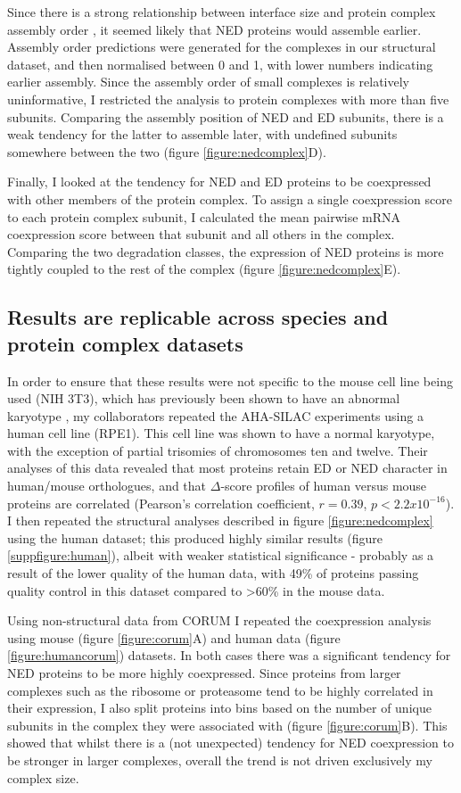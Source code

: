 \documentclass[a4paper,11pt,twoside,openright]{scrbook}
\begin{document}
Since there is a strong relationship between interface size and protein complex
assembly order \cite{Marsh2013}, it seemed likely that NED proteins would
assemble earlier. Assembly order predictions were generated for the complexes in
our structural dataset, and then normalised between 0 and 1, with lower numbers
indicating earlier assembly. Since the assembly order of small complexes is
relatively uninformative, I restricted the analysis to protein complexes with
more than five subunits. Comparing the assembly position of NED and ED subunits,
there is a weak tendency for the latter to assemble later, with undefined
subunits somewhere between the two (figure \ref{figure:nedcomplex}D).

Finally, I looked at the tendency for NED and ED proteins to be coexpressed with
other members of the protein complex. To assign a single coexpression score to
each protein complex subunit, I calculated the mean pairwise mRNA coexpression
score between that subunit and all others in the complex. Comparing the two
degradation classes, the expression of NED proteins is more tightly coupled to
the rest of the complex (figure \ref{figure:nedcomplex}E).

\subsection{Results are replicable across species and protein complex datasets}
In order to ensure that these results were not specific to the mouse cell line
being used (NIH 3T3), which has previously been shown to have an abnormal
karyotype \cite{Leibiger2013}, my collaborators repeated the AHA-SILAC
experiments using a human cell line (RPE1). This cell line was shown to have a
normal karyotype, with the exception of partial trisomies of chromosomes ten and
twelve. Their analyses of this data revealed that most proteins retain ED or NED
character in human/mouse orthologues, and that $\Delta$-score profiles of human
versus mouse proteins are correlated (Pearson’s correlation coefficient, $r =
0.39$, $p < 2.2x10^{-16}$). I then repeated the structural analyses described in
figure \ref{figure:nedcomplex} using the human dataset; this produced highly
similar results (figure \ref{suppfigure:human}), albeit with weaker statistical
significance - probably as a result of the lower quality of the human data, with
49\% of proteins passing quality control in this dataset compared to >60\% in
the mouse data.

Using non-structural data from CORUM  \cite{Ruepp2009} I repeated the
coexpression analysis using mouse (figure \ref{figure:corum}A) and human data
(figure \ref{figure:humancorum}) datasets. In both cases there was a significant
tendency for NED proteins to be more highly coexpressed. Since proteins from
larger complexes such as the ribosome or proteasome tend to be highly correlated
in their expression, I also split proteins into bins based on the number of
unique subunits in the complex they were associated with (figure
\ref{figure:corum}B). This showed that whilst there is a (not unexpected)
tendency for NED coexpression to be stronger in larger complexes, overall the
trend is not driven exclusively my complex size.  
\end{document}
